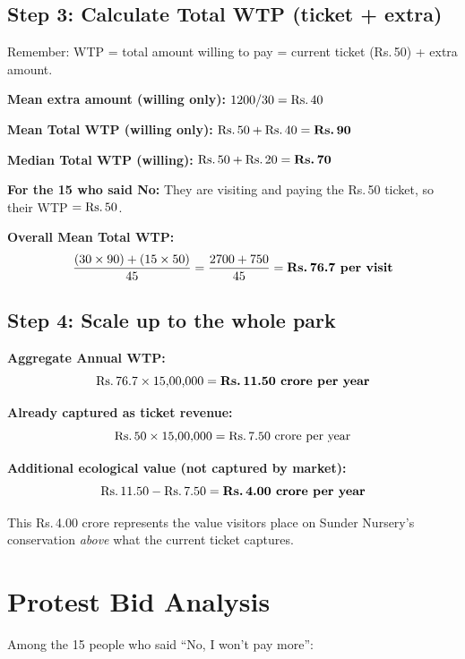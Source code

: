 \documentclass[11pt, a4paper]{article}
\newcommand{\rupee}{Rs.\,}
\newenvironment{keybox}{%
    \def\FrameCommand{\textcolor{accent}{\vrule width 2pt}\hspace{8pt}}%
    \MakeFramed{\advance\hsize-\width\FrameRestore}%
}{%
    \endMakeFramed%
}
\begin{document}
\subsection{Step 3: Calculate Total WTP (ticket + extra)}

Remember: WTP = total amount willing to pay = current ticket (\rupee 50) + extra amount.

\begin{keybox}
\textbf{Mean extra amount (willing only):} $1200 / 30 = \text{\rupee 40}$

\textbf{Mean Total WTP (willing only):} $\text{\rupee 50} + \text{\rupee 40} = \textbf{\rupee 90}$

\textbf{Median Total WTP (willing):} $\text{\rupee 50} + \text{\rupee 20} = \textbf{\rupee 70}$

\textbf{For the 15 who said No:} They are visiting and paying the \rupee 50 ticket, so their WTP $= \text{\rupee 50}$.

\textbf{Overall Mean Total WTP:}
\[ \frac{(30 \times 90) + (15 \times 50)}{45} = \frac{2700 + 750}{45} = \textbf{\rupee 76.7 per visit} \]
\end{keybox}

\subsection{Step 4: Scale up to the whole park}

\begin{keybox}
\textbf{Aggregate Annual WTP:}
\[ \text{\rupee 76.7} \times 15{,}00{,}000 = \textbf{\rupee 11.50 crore per year} \]

\textbf{Already captured as ticket revenue:}
\[ \text{\rupee 50} \times 15{,}00{,}000 = \text{\rupee 7.50 crore per year} \]

\textbf{Additional ecological value (not captured by market):}
\[ \text{\rupee 11.50} - \text{\rupee 7.50} = \textbf{\rupee 4.00 crore per year} \]

This \rupee 4.00 crore represents the value visitors place on Sunder Nursery's conservation \textit{above} what the current ticket captures.
\end{keybox}

\section{Protest Bid Analysis}

Among the 15 people who said ``No, I won't pay more'':
\end{document}
